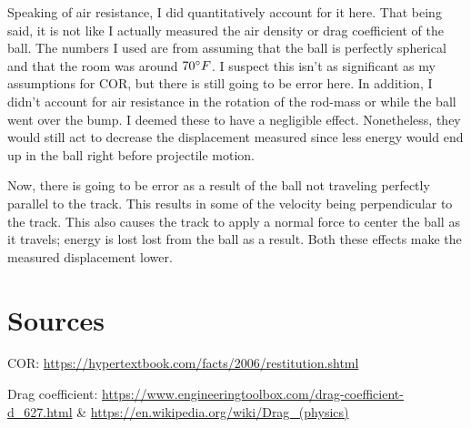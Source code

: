 \documentclass[12pt]{article} %
\begin{document}
Speaking of air resistance, I did quantitatively account for it here. That being said, it is not like I actually measured the air density or drag coefficient of the ball. The numbers I used are from assuming that the ball is perfectly spherical and that the room was around $70\degree F$. I suspect this isn't as significant as my assumptions for COR, but there is still going to be error here. In addition, I didn't account for air resistance in the rotation of the rod-mass or while the ball went over the bump. I deemed these to have a negligible effect. Nonetheless, they would still act to decrease the displacement measured since less energy would end up in the ball right before projectile motion.

Now, there is going to be error as a result of the ball not traveling perfectly parallel to the track. This results in some of the velocity being perpendicular to the track. This also causes the track to apply a normal force to center the ball as it travels; energy is lost lost from the ball as a result. Both these effects make the measured displacement lower.

\section{Sources}

COR: \url{https://hypertextbook.com/facts/2006/restitution.shtml}

\noindent Drag coefficient: \url{https://www.engineeringtoolbox.com/drag-coefficient-d_627.html} \& \url{https://en.wikipedia.org/wiki/Drag_(physics)}
\end{document}
